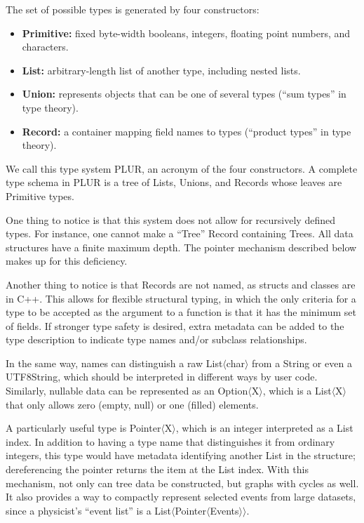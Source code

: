 \documentclass[10pt, conference, compsocconf]{IEEEtran}
\begin{document}
The set of possible types is generated by four constructors:
\begin{itemize}
\item {\bf Primitive:} fixed byte-width booleans, integers, floating point numbers, and characters.
\item {\bf List:} arbitrary-length list of another type, including nested lists.
\item {\bf Union:} represents objects that can be one of several types (``sum types'' in type theory).
\item {\bf Record:} a container mapping field names to types (``product types'' in type theory).
\end{itemize}
We call this type system PLUR, an acronym of the four constructors. A complete type schema in PLUR is a tree of Lists, Unions, and Records whose leaves are Primitive types.

One thing to notice is that this system does not allow for recursively defined types. For instance, one cannot make a ``Tree'' Record containing Trees. All data structures have a finite maximum depth. The pointer mechanism described below makes up for this deficiency.

Another thing to notice is that Records are not named, as structs and classes are in C++. This allows for flexible structural typing, in which the only criteria for a type to be accepted as the argument to a function is that it has the minimum set of fields. If stronger type safety is desired, extra metadata can be added to the type description to indicate type names and/or subclass relationships.

In the same way, names can distinguish a raw List$\langle$char$\rangle$ from a String or even a UTF8String, which should be interpreted in different ways by user code. Similarly, nullable data can be represented as an Option$\langle$X$\rangle$, which is a List$\langle$X$\rangle$ that only allows zero (empty, null) or one (filled) elements.

A particularly useful type is Pointer$\langle$X$\rangle$, which is an integer interpreted as a List index. In addition to having a type name that distinguishes it from ordinary integers, this type would have metadata identifying another List in the structure; dereferencing the pointer returns the item at the List index. With this mechanism, not only can tree data be constructed, but graphs with cycles as well. It also provides a way to compactly represent selected events from large datasets, since a physicist's ``event list'' is a List$\langle$Pointer$\langle$Events$\rangle\rangle$.
\end{document}
